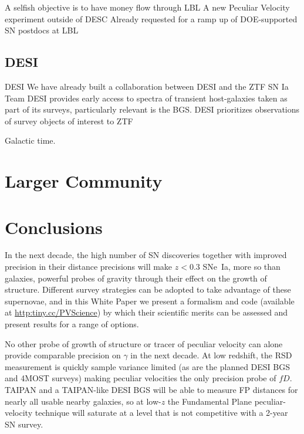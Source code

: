 \documentclass[11pt, oneside]{article}   	%
\begin{document}
A selfish objective is to have money flow through LBL
A new Peculiar Velocity experiment outside of DESC
Already requested for a ramp up of DOE-supported SN postdocs at LBL

\subsection{DESI}
DESI
We have already built a collaboration between DESI and the ZTF SN Ia Team
DESI provides early access to spectra of transient host-galaxies taken as part of its surveys, particularly relevant is the BGS.
DESI prioritizes observations of survey objects of interest to ZTF


Galactic time.

\section{Larger Community}

\section{Conclusions}

In the next decade,
the high number of SN discoveries together with improved precision in their distance precisions will make $z<0.3$ SNe~Ia, more so than
galaxies,  powerful probes of gravity through their effect  on the growth of structure.  Different survey strategies can be adopted to take advantage of these
supernovae, and in this White Paper we present a formalism and code (available
at \url{http:tiny.cc/PVScience})
by which their scientific merits can be assessed and present results for a range of options.

No other probe of growth of structure or tracer of peculiar velocity can alone provide comparable precision on  $\gamma$ in the next decade.
At low redshift, the RSD measurement is quickly sample variance limited (as are the planned DESI BGS and 4MOST surveys) making peculiar velocities the only 
precision probe of $fD$.
TAIPAN and a TAIPAN-like DESI BGS will be able to measure FP distances for nearly all usable nearby galaxies, so at low-$z$ the Fundamental Plane peculiar-velocity
technique will  saturate at a level that is not competitive with a  2-year SN survey.
\end{document}
